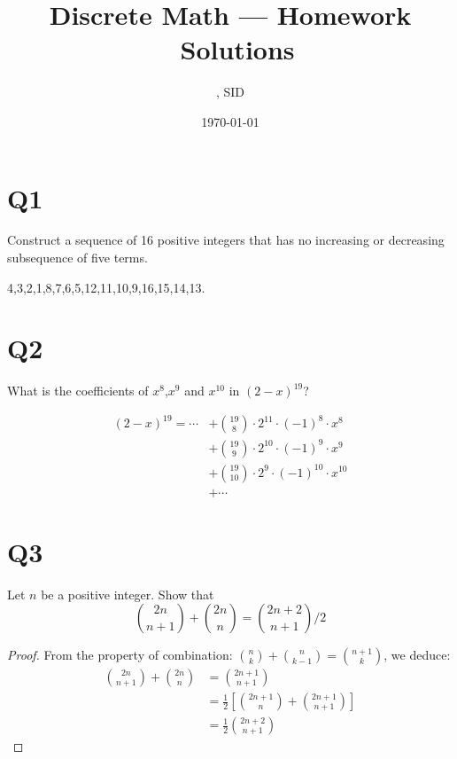 \documentclass[a4paper,11pt]{article}
\title{Discrete Math --- Homework \Homework \ Solutions}
\author{\Name, SID \SID}
\date{\today}
\begin{document}
\maketitle

\section*{Q1}
Construct a sequence of 16 positive integers that has no
increasing or decreasing subsequence of ﬁve terms.
\begin{solution}
    4,3,2,1,8,7,6,5,12,11,10,9,16,15,14,13.
\end{solution}

\section*{Q2}
What is the coeﬃcients of $x^{8}$,$x^{9}$ and $x^{10}$ in $(2-x)^{19}$?
\begin{solution}

\begin{align*}
(2-x)^{19} = \cdots 
    &+ \binom{19}{8} \cdot 2^{11}\cdot (-1)^{8} \cdot  x^{8}\\
    &+ \binom{19}{9}\cdot 2^{10} \cdot (-1)^{9}\cdot x^{9}\\
    &+ \binom{19}{10}\cdot 2^{9}\cdot (-1)^{10}\cdot x^{10}\\
    &+ \cdots 
\end{align*}
\end{solution}

\section*{Q3}
Let $n$ be a positive integer. Show that
$$
\binom{2n }{n+1 }+\binom{2n }{n}=\binom{2n+2 }{n+1 } / 2
$$
\begin{proof}
From the property of combination: 
$\binom{n }{k}+\binom{n }{k-1}=\binom{n+1 }{k}$, we deduce:
\begin{align*}
  \binom{2n }{n+1}+\binom{2n }{n}&=\binom{2n+1 }{n+1}\\
  &=\frac{1}{2}\left[\binom{2n+1 }{n}+\binom{2n+1}{n+1}\right]\\
  &=\frac{1}{2 }\binom{2n+2}{n+1}
\end{align*}
\end{proof}
\end{document}

